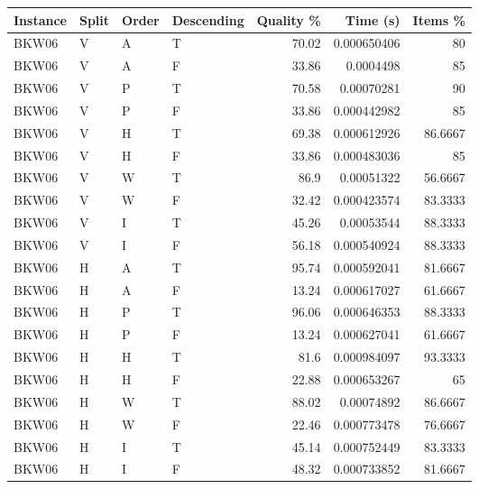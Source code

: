 \begin{tabular}{llllrrr}
    \hline
    Instance & Split & Order & Descending & Quality \% & Time (s)    & Items \% \\
    \hline
    BKW06    & V     & A     & T          & 70.02      & 0.000650406 & 80       \\
    BKW06    & V     & A     & F          & 33.86      & 0.0004498   & 85       \\
    BKW06    & V     & P     & T          & 70.58      & 0.00070281  & 90       \\
    BKW06    & V     & P     & F          & 33.86      & 0.000442982 & 85       \\
    BKW06    & V     & H     & T          & 69.38      & 0.000612926 & 86.6667  \\
    BKW06    & V     & H     & F          & 33.86      & 0.000483036 & 85       \\
    BKW06    & V     & W     & T          & 86.9       & 0.00051322  & 56.6667  \\
    BKW06    & V     & W     & F          & 32.42      & 0.000423574 & 83.3333  \\
    BKW06    & V     & I     & T          & 45.26      & 0.00053544  & 88.3333  \\
    BKW06    & V     & I     & F          & 56.18      & 0.000540924 & 88.3333  \\
    BKW06    & H     & A     & T          & 95.74      & 0.000592041 & 81.6667  \\
    BKW06    & H     & A     & F          & 13.24      & 0.000617027 & 61.6667  \\
    BKW06    & H     & P     & T          & 96.06      & 0.000646353 & 88.3333  \\
    BKW06    & H     & P     & F          & 13.24      & 0.000627041 & 61.6667  \\
    BKW06    & H     & H     & T          & 81.6       & 0.000984097 & 93.3333  \\
    BKW06    & H     & H     & F          & 22.88      & 0.000653267 & 65       \\
    BKW06    & H     & W     & T          & 88.02      & 0.00074892  & 86.6667  \\
    BKW06    & H     & W     & F          & 22.46      & 0.000773478 & 76.6667  \\
    BKW06    & H     & I     & T          & 45.14      & 0.000752449 & 83.3333  \\
    BKW06    & H     & I     & F          & 48.32      & 0.000733852 & 81.6667  \\

\end{tabular}
